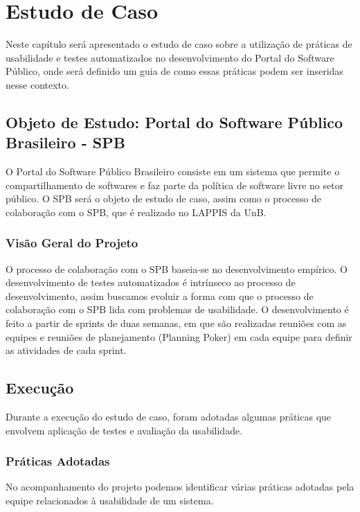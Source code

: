 \chapter{Estudo de Caso}

Neste capítulo será apresentado o estudo de caso sobre a utilização de práticas de usabilidade e testes automatizados no desenvolvimento do Portal do Software Público, onde será definido um guia de como essas práticas podem ser inseridas nesse contexto.

\section{Objeto de Estudo: Portal do Software Público Brasileiro - SPB}

O Portal do Software Público Brasileiro consiste em um sistema que permite o compartilhamento de softwares e faz parte da política de software livre no setor público.
O SPB será o objeto de estudo de caso, assim como o processo de colaboração com o SPB, que é realizado no LAPPIS da UnB.

\subsection{Visão Geral do Projeto}

O processo de colaboração com o SPB baseia-se no desenvolvimento empírico. O desenvolvimento de testes automatizados é intrínseco ao processo de desenvolvimento, assim buscamos evoluir a forma com que o processo de colaboração com o SPB lida com problemas de usabilidade.
O desenvolvimento é feito a partir de sprints de duas semanas, em que são realizadas reuniões com as equipes e reuniões de planejamento (Planning Poker) em cada equipe para definir as atividades de cada sprint.

\section{Execução}

Durante a execução do estudo de caso, foram adotadas algumas práticas que envolvem aplicação de testes e avaliação da usabilidade.

\subsection{Práticas Adotadas}

No acompanhamento do projeto podemos identificar várias práticas adotadas pela equipe relacionados à usabilidade de um sistema.


